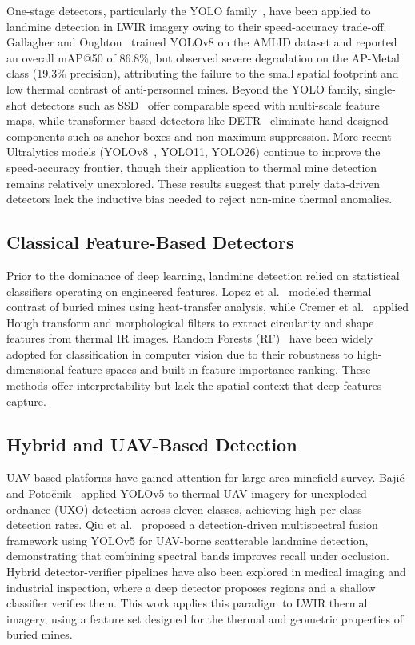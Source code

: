\documentclass[conference]{IEEEtran}
\begin{document}
One-stage detectors, particularly the YOLO family~\cite{redmon2016,jocher2026yolo26}, have been applied to landmine detection in LWIR imagery owing to their speed-accuracy trade-off. Gallagher and Oughton~\cite{gallagher2025} trained YOLOv8 on the AMLID dataset and reported an overall mAP@50 of 86.8\%, but observed severe degradation on the AP-Metal class (19.3\% precision), attributing the failure to the small spatial footprint and low thermal contrast of anti-personnel mines. Beyond the YOLO family, single-shot detectors such as SSD~\cite{liu2016} offer comparable speed with multi-scale feature maps, while transformer-based detectors like DETR~\cite{carion2020} eliminate hand-designed components such as anchor boxes and non-maximum suppression. More recent Ultralytics models (YOLOv8~\cite{jocher2023yolov8}, YOLO11, YOLO26) continue to improve the speed-accuracy frontier, though their application to thermal mine detection remains relatively unexplored. These results suggest that purely data-driven detectors lack the inductive bias needed to reject non-mine thermal anomalies.

\subsection{Classical Feature-Based Detectors}

Prior to the dominance of deep learning, landmine detection relied on statistical classifiers operating on engineered features. Lopez et al.~\cite{lopez2004} modeled thermal contrast of buried mines using heat-transfer analysis, while Cremer et al.~\cite{cremer2002} applied Hough transform and morphological filters to extract circularity and shape features from thermal IR images. Random Forests (RF)~\cite{breiman2001} have been widely adopted for classification in computer vision due to their robustness to high-dimensional feature spaces and built-in feature importance ranking. These methods offer interpretability but lack the spatial context that deep features capture.

\subsection{Hybrid and UAV-Based Detection}

UAV-based platforms have gained attention for large-area minefield survey. Bajić and Potočnik~\cite{bajic2023} applied YOLOv5 to thermal UAV imagery for unexploded ordnance (UXO) detection across eleven classes, achieving high per-class detection rates. Qiu et al.~\cite{qiu2023} proposed a detection-driven multispectral fusion framework using YOLOv5 for UAV-borne scatterable landmine detection, demonstrating that combining spectral bands improves recall under occlusion. Hybrid detector-verifier pipelines have also been explored in medical imaging and industrial inspection, where a deep detector proposes regions and a shallow classifier verifies them. This work applies this paradigm to LWIR thermal imagery, using a feature set designed for the thermal and geometric properties of buried mines.
\end{document}
